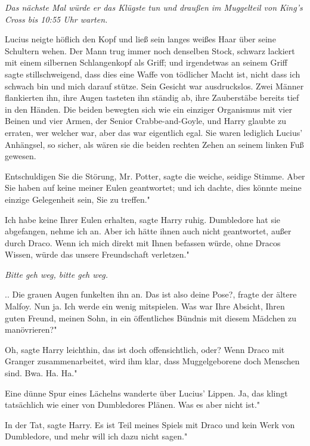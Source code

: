 \emph{Das nächste Mal würde er das Klügste tun und draußen im Muggelteil von
King's Cross bis 10:55 Uhr warten.}

Lucius neigte höflich den Kopf und ließ sein langes weißes Haar über seine
Schultern wehen. Der Mann trug immer noch denselben Stock, schwarz lackiert mit
einem silbernen Schlangenkopf als Griff; und irgendetwas an seinem Griff sagte
stillschweigend, dass dies eine Waffe von tödlicher Macht ist, nicht dass ich
schwach bin und mich darauf stütze. Sein Gesicht war ausdruckslos. Zwei Männer
flankierten ihn, ihre Augen tasteten ihn ständig ab, ihre Zauberstäbe bereits
tief in den Händen. Die beiden bewegten sich wie ein einziger Organismus mit
vier Beinen und vier Armen, der Senior Crabbe-and-Goyle, und Harry glaubte zu
erraten, wer welcher war, aber das war eigentlich egal. Sie waren lediglich
Lucius' Anhängsel, so sicher, als wären sie die beiden rechten Zehen an seinem
linken Fuß gewesen.

\glqq{}Entschuldigen Sie die Störung, Mr. Potter\grqq{}, sagte die weiche,
seidige Stimme. \glqq{}Aber Sie haben auf keine meiner Eulen geantwortet; und
ich dachte, dies könnte meine einzige Gelegenheit sein, Sie zu treffen."

\glqq{}Ich habe keine Ihrer Eulen erhalten\grqq{}, sagte Harry ruhig. \glqq
Dumbledore hat sie abgefangen, nehme ich an. Aber ich hätte ihnen auch nicht
geantwortet, außer durch Draco. Wenn ich mich direkt mit Ihnen befassen würde,
ohne Dracos Wissen, würde das unsere Freundschaft verletzen."

\emph{Bitte geh weg, bitte geh weg.}

.. Die grauen Augen funkelten ihn an. \glqq{}Das ist also deine Pose?\grqq{},
fragte der ältere Malfoy. \glqq{}Nun ja. Ich werde ein wenig mitspielen. Was war
Ihre Absicht, Ihren guten Freund, meinen Sohn, in ein öffentliches Bündnis mit
diesem Mädchen zu manövrieren?"

\glqq{}Oh\grqq{}, sagte Harry leichthin, \glqq{}das ist doch offensichtlich,
oder? Wenn Draco mit Granger zusammenarbeitet, wird ihm klar, dass
Muggelgeborene doch Menschen sind. Bwa. Ha. Ha."

Eine dünne Spur eines Lächelns wanderte über Lucius' Lippen. \glqq{}Ja, das
klingt tatsächlich wie einer von Dumbledores Plänen. Was es aber nicht ist."

\glqq{}In der Tat\grqq{}, sagte Harry. \glqq{}Es ist Teil meines Spiels mit
Draco und kein Werk von Dumbledore, und mehr will ich dazu nicht sagen."


